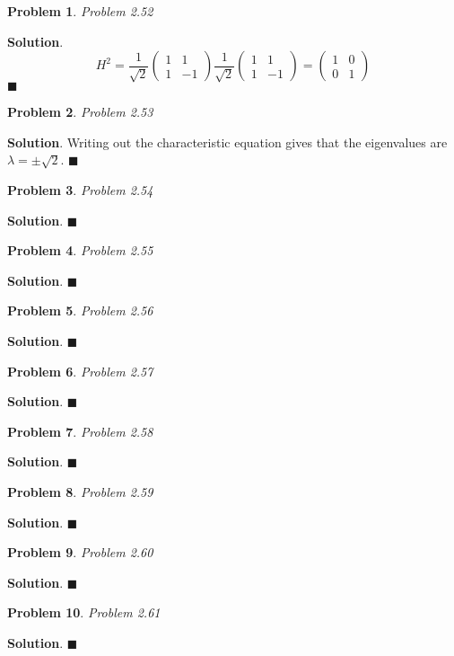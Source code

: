 \documentclass[12pt]{article}
\newtheorem{p}{Problem}
\theoremstyle{definition}
\newenvironment{s}{%
        \begin{trivlist} \item \textbf{Solution}. }{%
            \hspace*{\fill} $\blacksquare$\end{trivlist}}%
\begin{document}
{\begin{p}
Problem 2.52
\end{p}

\begin{s}
\begin{equation*}
H^{2} =  \frac{1}{\sqrt{2}}
\begin{pmatrix}
1 & 1\\ 1& -1
\end{pmatrix} \frac{1}{\sqrt{2}}
\begin{pmatrix}
1 & 1\\ 1& -1
\end{pmatrix} = 
\begin{pmatrix}
1 & 0\\ 0& 1
\end{pmatrix}
\end{equation*}
\end{s}

\begin{p}
Problem 2.53
\end{p}

\begin{s}
Writing out the characteristic equation gives that the eigenvalues are $\lambda = \pm \sqrt{2}$. 
\end{s}

\begin{p}
Problem 2.54
\end{p}

\begin{s}
\end{s}

\begin{p}
Problem 2.55
\end{p}

\begin{s}
\end{s}

\begin{p}
Problem 2.56
\end{p}

\begin{s}
\end{s}

\begin{p}
Problem 2.57
\end{p}

\begin{s}
\end{s}

\begin{p}
Problem 2.58
\end{p}

\begin{s}
\end{s}

\begin{p}
Problem 2.59
\end{p}

\begin{s}
\end{s}

\begin{p}
Problem 2.60
\end{p}

\begin{s}
\end{s}
\begin{p}
Problem 2.61
\end{p}

\begin{s}
\end{s}
\end{document}
